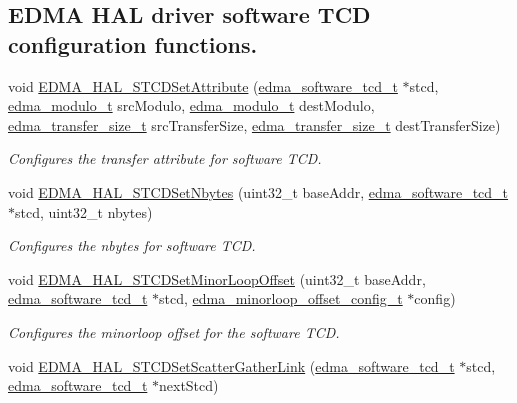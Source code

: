 \subsection*{E\+D\+MA H\+AL driver software T\+CD configuration functions.}
\begin{DoxyCompactItemize}
\item 
void \hyperlink{group__edma__hal_ga1d27f98767e3b9255305f3d414a88439}{E\+D\+M\+A\+\_\+\+H\+A\+L\+\_\+\+S\+T\+C\+D\+Set\+Attribute} (\hyperlink{group__edma__hal_ga7cc4084521c106d714c925fddff92b40}{edma\+\_\+software\+\_\+tcd\+\_\+t} $\ast$stcd, \hyperlink{group__edma__hal_ga567f4aba444f1fb55ac796ea3c12b1f6}{edma\+\_\+modulo\+\_\+t} src\+Modulo, \hyperlink{group__edma__hal_ga567f4aba444f1fb55ac796ea3c12b1f6}{edma\+\_\+modulo\+\_\+t} dest\+Modulo, \hyperlink{group__edma__hal_ga3cd26ca8831986959f668621f2e52d32}{edma\+\_\+transfer\+\_\+size\+\_\+t} src\+Transfer\+Size, \hyperlink{group__edma__hal_ga3cd26ca8831986959f668621f2e52d32}{edma\+\_\+transfer\+\_\+size\+\_\+t} dest\+Transfer\+Size)
\begin{DoxyCompactList}\small\item\em Configures the transfer attribute for software T\+CD. \end{DoxyCompactList}\item 
void \hyperlink{group__edma__hal_gac53994cb65a8689aff4e203f9c628953}{E\+D\+M\+A\+\_\+\+H\+A\+L\+\_\+\+S\+T\+C\+D\+Set\+Nbytes} (uint32\+\_\+t base\+Addr, \hyperlink{group__edma__hal_ga7cc4084521c106d714c925fddff92b40}{edma\+\_\+software\+\_\+tcd\+\_\+t} $\ast$stcd, uint32\+\_\+t nbytes)
\begin{DoxyCompactList}\small\item\em Configures the nbytes for software T\+CD. \end{DoxyCompactList}\item 
void \hyperlink{group__edma__hal_gac9d7aa8de4ddd8b488c19f7b947e0bbf}{E\+D\+M\+A\+\_\+\+H\+A\+L\+\_\+\+S\+T\+C\+D\+Set\+Minor\+Loop\+Offset} (uint32\+\_\+t base\+Addr, \hyperlink{group__edma__hal_ga7cc4084521c106d714c925fddff92b40}{edma\+\_\+software\+\_\+tcd\+\_\+t} $\ast$stcd, \hyperlink{group__edma__hal_gad5e547af3f3fbe7a4250c05007e65ce9}{edma\+\_\+minorloop\+\_\+offset\+\_\+config\+\_\+t} $\ast$config)
\begin{DoxyCompactList}\small\item\em Configures the minorloop offset for the software T\+CD. \end{DoxyCompactList}\item 
void \hyperlink{group__edma__hal_gaf1d05ba8a7dd8a5b8a54d97753bad20d}{E\+D\+M\+A\+\_\+\+H\+A\+L\+\_\+\+S\+T\+C\+D\+Set\+Scatter\+Gather\+Link} (\hyperlink{group__edma__hal_ga7cc4084521c106d714c925fddff92b40}{edma\+\_\+software\+\_\+tcd\+\_\+t} $\ast$stcd, \hyperlink{group__edma__hal_ga7cc4084521c106d714c925fddff92b40}{edma\+\_\+software\+\_\+tcd\+\_\+t} $\ast$next\+Stcd)

\end{DoxyCompactItemize}
